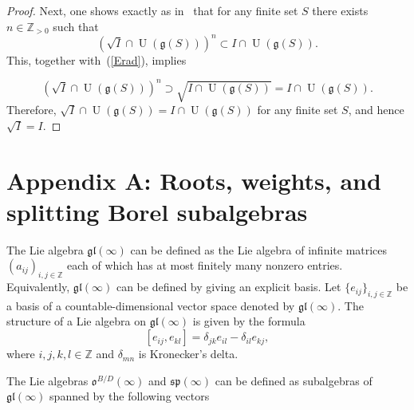 \documentclass{emsprocart}
\begin{document}
\begin{proof}
Next, one shows exactly as in~\cite[3.1.15]{Dix} that for any finite set $S$ there exists $n\in\mathbb Z_{>0}$ such that
$$(\sqrt I\cap\operatorname{U}(\mathfrak g(S)))^n\subset I\cap\operatorname{U}(\mathfrak g(S)).$$ This, together with~(\ref{Erad}), implies

$$(\sqrt I\cap\operatorname{U}(\mathfrak g(S)))^n\supset \sqrt{I\cap\operatorname{U}(\mathfrak g(S))}=I\cap\operatorname{U}(\mathfrak g(S)).$$ Therefore, $\sqrt I\cap\operatorname{U}(\mathfrak g(S))=I\cap\operatorname{U}(\mathfrak g(S))$ for any finite set $S$, and hence $\sqrt I=I$.

\end{proof}


\section*{Appendix A: Roots, weights, and splitting Borel subalgebras}
\label{SSsodef}
The Lie algebra $\mathfrak{gl}(\infty)$ can be defined  as the Lie algebra of infinite matrices $(a_{ij})_{i, j\in\mathbb Z}$ each of which has at most finitely many nonzero entries. Equivalently, $\mathfrak{gl}(\infty)$ can be defined by giving an explicit basis. Let $\{e_{ij}\}_{i, j\in\mathbb Z}$ be a basis of a countable-dimensional vector space denoted by $\mathfrak{gl}(\infty)$. The structure of a Lie algebra on $\mathfrak{gl}(\infty)$ is given by the formula
$$[e_{ij},
e_{kl}]=\delta_{jk}e_{il}-\delta_{il}e_{kj},$$
where $i, j, k, l\in\mathbb Z$ and $\delta_{mn}$ is Kronecker's delta.

The Lie algebras $\mathfrak o^{B/D}(\infty)$ and $\mathfrak{sp}(\infty)$ can be defined as subalgebras of $\mathfrak{gl}(\infty)$ spanned by the following vectors
\end{document}
